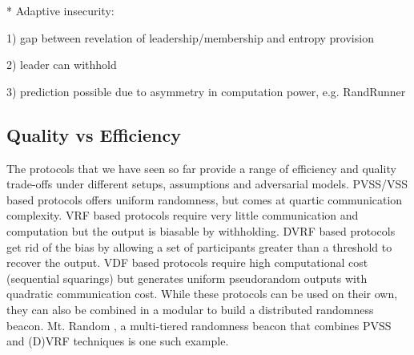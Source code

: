 \documentclass[letterpaper,twocolumn,10pt]{article}
\theoremstyle{definition}
\theoremstyle{remark}
\begin{document}
* Adaptive insecurity:

1) gap between revelation of leadership/membership and entropy provision

2) leader can withhold

3) prediction possible due to asymmetry in computation power, e.g. RandRunner

\subsection{Quality vs Efficiency}
The protocols that we have seen so far provide a range of efficiency and quality trade-offs under different setups, assumptions and adversarial models. PVSS/VSS based protocols offers uniform randomness, but comes at  quartic communication complexity. 
VRF based protocols require very little communication and computation but the output is biasable by withholding. DVRF based protocols get rid of the bias by allowing a set of participants greater than a threshold to recover the output. VDF based protocols require high computational cost (sequential squarings) but generates uniform pseudorandom outputs with quadratic communication cost. While these protocols can be used on their own, they can also be combined in a modular to build a distributed randomness beacon. Mt. Random \cite{cascudomt}, a multi-tiered randomness beacon that combines PVSS and (D)VRF techniques is one such example. 
\end{document}
